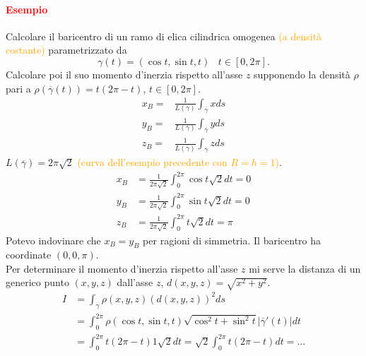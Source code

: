 \documentclass{article}
\begin{document}
\paragraph{\textcolor{red}{Esempio}}
Calcolare il baricentro di un ramo di elica cilindrica omogenea \textcolor{orange}{(a densità costante)} parametrizzato da 
\begin{equation*}
    \gamma (t)=(\cos t , \sin t , t)\,\,\,\,\, t \in [0, 2 \pi].
\end{equation*}
Calcolare poi il suo momento d'inerzia rispetto all'asse $z$ supponendo la densità $\rho $ pari a $\rho(\overline{\gamma}(t))=t(2\pi-t)$, $t\in [0,2\pi]$.
\begin{align*}
    x_B=& \frac{1}{L(\overline{\gamma})}\int_{\overline{\gamma}}x ds\\
    y_B=& \frac{1}{L(\overline{\gamma})}\int_{\overline{\gamma}}y ds\\
    z_B=& \frac{1}{L(\overline{\gamma})}\int_{\overline{\gamma}}z ds
\end{align*}
$L(\overline{\gamma})=2\pi \sqrt{2}$ \textcolor{orange}{(curva dell'esempio precedente con $R=h=1$)}.
\begin{align*}
    x_B&=\frac{1}{2\pi \sqrt{2}}\int_0^{2\pi}\cos t \sqrt{2} dt =0\\
    y_B&=\frac{1}{2\pi \sqrt{2}}\int_0^{2\pi}\sin t \sqrt{2} dt =0 \\
    z_B&= \frac{1}{2\pi \sqrt{2}}\int_0^{2\pi}t \sqrt{2}dt=\pi
\end{align*}
Potevo indovinare che $x_B=y_B$ per ragioni di simmetria. Il baricentro ha coordinate $(0,0,\pi)$.\\
Per determinare il momento d'inerzia rispetto all'asse $z$ mi serve la distanza di un generico punto $(x,y,z)$ dall'asse $z$, $d(x,y,z)=\sqrt{x^2+y^2}$.
\begin{align*}
    I&=\int_{\overline{\gamma}}\rho(x,y,z)(d(x,y,z))^2 ds\\
    &= \int_0^{2\pi} \rho(\cos t , \sin t , t)\sqrt{\cos^2 t +\sin ^2 t}|\overline{\gamma}'(t)|dt\\
    &= \int_0^{2\pi}t(2\pi -t )1 \sqrt{2}dt = \sqrt{2}\int_0^{2\pi} t(2\pi -t)dt=...
\end{align*}
\end{document}
